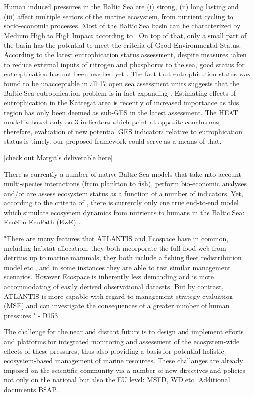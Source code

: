 \documentclass[10pt,letterpaper]{article}
\begin{document}
Human induced pressures in the Baltic Sea are (i) strong, (ii) long lasting and (iii) affect multiple sectors of the marine ecosystem, from nutrient cycling to socio-economic processes. Most of the Baltic Sea basin can be characterized by Medium High to High Impact according to \citet{HalpernB08}. On top of that, only a small part of the basin has the potential to meet the criteria of Good Environmental Status. According to the latest eutrophication status assessment, despite measures taken to reduce external inputs of nitrogen and phosphorus to the sea, good status for eutrophication has not been reached yet \citep{HELCOM14}. The fact that eutrophication status was found to be unacceptable in all 17 open sea assessment units suggests that the Baltic Sea eutrophication problem is in fact expanding \citep{Fleming-LehtinenV15}. Estimating effects of eutrophication in the Kattegat area is recently of increased importance as this region has only been deemed as sub-GES in the latest assessment. The HEAT model is based only on 3 indicators which point at opposite conclusions, therefore, evaluation of new potential GES indicators relative to eutrophication status is timely. our proposed framework could serve as a means of that. 

[check out Margit's deliverable here]

There is currently a number of native Baltic Sea models that take into account multi-species interactions (from plankton to fish), perform bio-economic analyses and/or are assess ecosystem status as a function of a number of indicators. Yet, according to the criteria of \citet{RoseK12}, there is currently only one true end-to-end model which simulate ecosystem dynamics from nutrients to humans in the Baltic Sea: EcoSim-EcoPath (EwE) \citep{Harvey,Tomczakm10}. 

"There are many features that ATLANTIS and Ecospace have in common, including habitat
allocation, they both incorporate the full food-web from detritus up to marine mammals, they
both include a fishing fleet redistribution model etc., and in some instances they are able to test
similar management scenarios. However Ecospace is inherently less demanding and is more
accommodating of easily derived observational datasets. But by contrast, ATLANTIS is more
capable with regard to management strategy evaluation (MSE) and can investigate the
consequences of a greater number of human pressures." - D153


The challenge for the near and distant future is to design and implement efforts and platforms for integrated monitoring and assessment of the ecosystem-wide effects of these pressures, thus also providing a basis for potential holistic ecosystem-based management of marine resources. These challanges are already imposed on the scientific community via a number of new directives and policies not only on the national but also the EU level: MSFD, WD etc. Additional documents BSAP...
\end{document}
